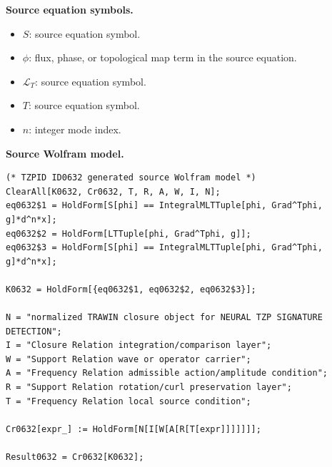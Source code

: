 \begin{minipage}[t]{0.49\linewidth}
\begingroup
\small
\raggedright
\textbf{Source equation symbols.}\par
\begin{itemize}[leftmargin=1.35em,itemsep=1pt,topsep=1pt,parsep=0pt]
    \item $S$: source equation symbol.
    \item $\phi$: flux, phase, or topological map term in the source equation.
    \item $\mathcal{L}_T$: source equation symbol.
    \item $T$: source equation symbol.
    \item $n$: integer mode index.
\end{itemize}
\endgroup
\end{minipage}\hfill
\begin{minipage}[t]{0.47\linewidth}
\begingroup
\scriptsize
\raggedright
\textbf{Source Wolfram model.}\par
\begin{Verbatim}[fontsize=\tiny,breaklines=true,breakanywhere=true]
(* TZPID ID0632 generated source Wolfram model *)
ClearAll[K0632, Cr0632, T, R, A, W, I, N];
eq0632$1 = HoldForm[S[phi] == IntegralMLTTuple[phi, Grad^Tphi, g]*d^n*x];
eq0632$2 = HoldForm[LTTuple[phi, Grad^Tphi, g]];
eq0632$3 = HoldForm[S[phi] == IntegralMLTTuple[phi, Grad^Tphi, g]*d^n*x];

K0632 = HoldForm[{eq0632$1, eq0632$2, eq0632$3}];

N = "normalized TRAWIN closure object for NEURAL TZP SIGNATURE DETECTION";
I = "Closure Relation integration/comparison layer";
W = "Support Relation wave or operator carrier";
A = "Frequency Relation admissible action/amplitude condition";
R = "Support Relation rotation/curl preservation layer";
T = "Frequency Relation local source condition";

Cr0632[expr_] := HoldForm[N[I[W[A[R[T[expr]]]]]]];

Result0632 = Cr0632[K0632];
\end{Verbatim}
\endgroup
\end{minipage}

